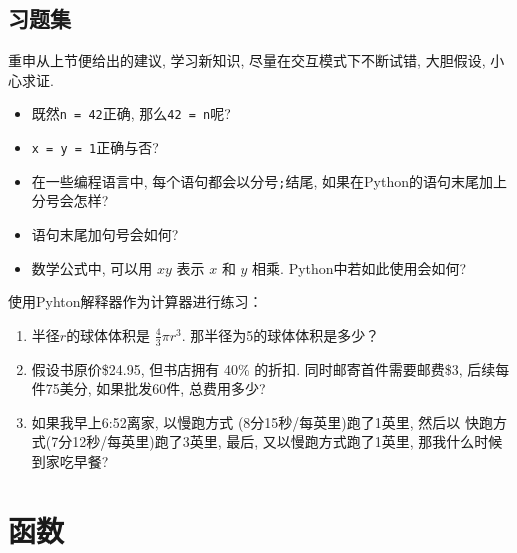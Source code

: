 \documentclass[10pt]{book}
\begin{document}
\section{习题集}

\begin{exercise}

重申从上节便给出的建议, 学习新知识, 
尽量在交互模式下不断试错, 大胆假设, 小心求证. 

\begin{itemize}

\item 既然{\tt n = 42}正确, 那么{\tt 42 = n}呢?

\item {\tt x = y = 1}正确与否?

\item 在一些编程语言中, 每个语句都会以分号{\tt ;}结尾, 
如果在Python的语句末尾加上分号会怎样?

\item 语句末尾加句号会如何?

\item 数学公式中, 可以用 $x y$ 表示 $x$ 和 $y$ 相乘. Python中若如此使用会如何?

\end{itemize}

\end{exercise}


\begin{exercise}

使用Pyhton解释器作为计算器进行练习： 

\begin{enumerate}

\item 半径$r$的球体体积是 $\frac{4}{3} \pi r^3$. 那半径为5的球体体积是多少？

\item 假设书原价\$24.95, 但书店拥有 40\% 的折扣. 
同时邮寄首件需要邮费\$3, 后续每件75美分, 
如果批发60件, 总费用多少?

\item 如果我早上6:52离家, 以慢跑方式 (8分15秒/每英里)跑了1英里, 然后以
快跑方式(7分12秒/每英里)跑了3英里, 最后, 又以慢跑方式跑了1英里, 
那我什么时候到家吃早餐?

\end{enumerate}
\end{exercise}


\chapter{函数}
\label{funcchap}
\end{document}
